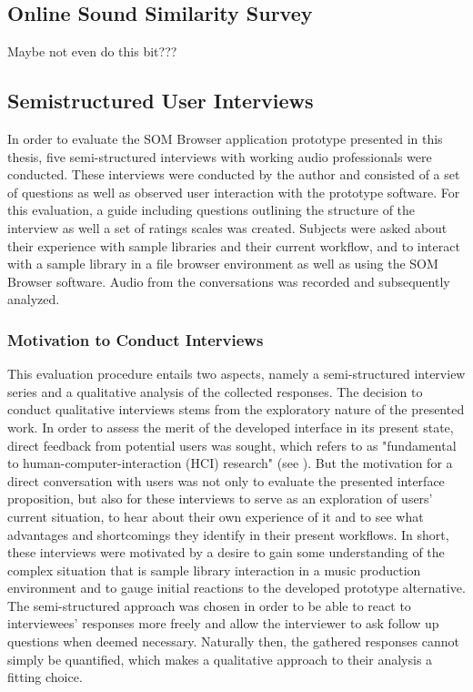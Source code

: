 \subsection{Online Sound Similarity Survey}
\label{subsec:evaluation_survey}
Maybe not even do this bit???

\subsection{Semistructured User Interviews}
\label{subsec:evaluation_interviews}

In order to evaluate the SOM Browser application prototype presented in this
thesis, five semi-structured interviews with working audio professionals were
conducted. These interviews were conducted by the author and consisted of a set
of questions as well as observed user interaction with the prototype software.
For this evaluation, a guide including questions outlining the
structure of the interview as well a set of ratings scales was created. Subjects
were asked about their experience with sample libraries and their current
workflow, and to interact with a sample library in a file browser environment as
well as using the SOM Browser software. Audio from the conversations was
recorded and subsequently analyzed.

\subsubsection{Motivation to Conduct Interviews}
\label{subsubsec:interview_motivation}

This evaluation procedure entails two aspects, namely a semi-structured
interview series and a qualitative analysis of the collected responses. The
decision to conduct qualitative interviews stems from the exploratory nature of
the presented work. In order to assess the merit of the developed interface in
its present state, direct feedback from potential users was sought, which
\citet{lazar2017} refers to as "fundamental to human-computer-interaction (HCI)
research" (see \citet[p.187]{lazar2017}). But the motivation for a direct
conversation with users was not only to evaluate the presented interface
proposition, but also for these interviews to serve as an exploration of users'
current situation, to hear about their own experience of it and to see what
advantages and shortcomings they identify in their present workflows. In short,
these interviews were motivated by a desire to gain some understanding of the
complex situation that is sample library interaction in a music production
environment and to gauge initial reactions to the developed prototype
alternative. The semi-structured approach was chosen in order to be able to
react to interviewees' responses more freely and allow the interviewer to ask
follow up questions when deemed necessary. Naturally then, the gathered
responses cannot simply be quantified, which makes a qualitative approach to
their analysis a fitting choice.

